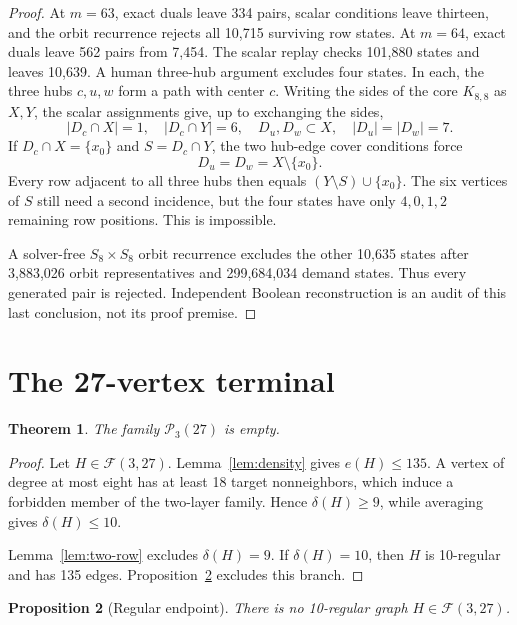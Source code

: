 \documentclass[11pt,reqno,a4paper]{amsart}
\newtheorem{theorem}{Theorem}[section]
\newtheorem{proposition}[theorem]{Proposition}
\theoremstyle{definition}
\theoremstyle{remark}
\newcommand{\cF}{\mathcal F}
\newcommand{\cP}{\mathcal P}
\begin{document}
\begin{proof}
At $m=63$, exact duals leave 334 pairs, scalar conditions leave thirteen,
and the orbit recurrence rejects all 10,715 surviving row states. At
$m=64$, exact duals leave 562 pairs from 7,454. The scalar replay checks
101,880 states and leaves 10,639. A human three-hub argument excludes four
states. In each, the three hubs $c,u,w$ form a path with center $c$.
Writing the sides of the core $K_{8,8}$ as $X,Y$, the scalar assignments
give, up to exchanging the sides,
\[
 |D_c\cap X|=1,\quad |D_c\cap Y|=6,\quad
 D_u,D_w\subset X,\quad |D_u|=|D_w|=7.
\]
If $D_c\cap X=\{x_0\}$ and $S=D_c\cap Y$, the two hub-edge cover
conditions force
\[
 D_u=D_w=X\setminus\{x_0\}.
\]
Every row adjacent to all three hubs then equals
$(Y\setminus S)\cup\{x_0\}$. The six vertices of $S$ still need a
second incidence, but the four states have only $4,0,1,2$ remaining row
positions. This is impossible.

A solver-free $S_8\times S_8$ orbit recurrence excludes the other
10,635 states after 3,883,026 orbit representatives and 299,684,034
demand states. Thus every generated pair is rejected. Independent Boolean
reconstruction is an audit of this last conclusion, not its proof premise.
\end{proof}

\section{The 27-vertex terminal}\label{sec:o27}

\begin{theorem}\label{thm:o27}
The family $\cP_3(27)$ is empty.
\end{theorem}

\begin{proof}
Let $H\in\cF(3,27)$. Lemma~\ref{lem:density} gives $e(H)\le135$.
A vertex of degree at most eight has at least 18 target nonneighbors,
which induce a forbidden member of the two-layer family. Hence
$\delta(H)\ge9$, while averaging gives $\delta(H)\le10$.

Lemma~\ref{lem:two-row} excludes $\delta(H)=9$. If $\delta(H)=10$, then
$H$ is 10-regular and has 135 edges. Proposition~\ref{prop:d10}
excludes this branch.
\end{proof}

\begin{proposition}[Regular endpoint]\label{prop:d10}
There is no 10-regular graph $H\in\cF(3,27)$.
\end{proposition}
\end{document}
